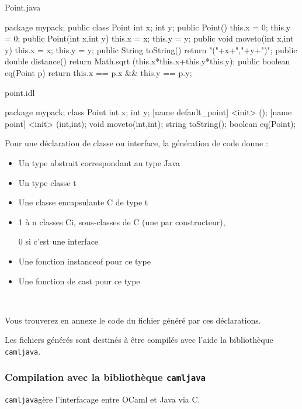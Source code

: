 \documentclass[a4paper, 11pt]{article}
\newcommand{\camljava}{{\tt{camljava}}}
\begin{document}
\begin{multicols}{2}
Point.java
\begin{javaEx}
  package mypack;
  public class Point {
    int x;
    int y;
    public Point() { 
      this.x = 0;
      this.y = 0;
    }
    public Point(int x,int y) {
      this.x = x;
      this.y = y;
    }
    public void moveto(int x,int y){
      this.x = x;
      this.y = y;
    }
    public String toString() {
      return "("+x+","+y+")";
    }
    public double distance() {
      return Math.sqrt
      (this.x*this.x+this.y*this.y);
    }
    public boolean eq(Point p) {
      return this.x == p.x 
          && this.y == p.y;
    }
  }
\end{javaEx}

\bigskip

point.idl
\begin{idlEx}
package mypack;
class Point {
  int x;
  int y; 
  [name default_point] <init> ();
  [name point] <init> (int,int);
  void moveto(int,int);
  string toString();
  boolean eq(Point);
}
\end{idlEx}

Pour une déclaration de classe ou interface, la génération de code
donne :
\begin{itemize}
  \item Un type abstrait correspondant au type Java
  \item Un type classe t
  \item Une classe encapsulante C de type t
  \item 1 à n classes Ci, sous-classes de C (une par constructeur),
 
    0 si c'est une interface
  \item Une fonction instanceof pour ce type
  \item Une fonction de cast pour ce type
\end{itemize}

\ 
\newline

\bigskip

\end{multicols}
Vous trouverez en annexe le code du fichier généré par ces déclarations.

Les fichiers générés sont destinés à être compilés avec l'aide la bibliothèque
\camljava.

\subsubsection{Compilation avec la bibliothèque \camljava}
\camljava gère l'interfacage entre OCaml et Java via C.
\end{document}
